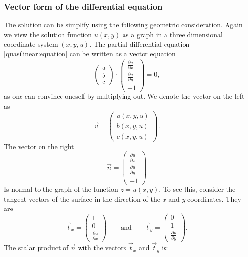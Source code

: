 \subsubsection{Vector form of the differential equation}
The solution can be simplify using the following geometric consideration.
Again we view the solution function $u(x,y)$ as a graph in a three dimensional
coordinate system $(x,y,u)$.
The partial differential equation \eqref{quasilinear:equation}
can be written as a vector equation
\begin{equation}
\begin{pmatrix}a\\b\\c\end{pmatrix}
\cdot
\begin{pmatrix}
\frac{\partial u}{\partial x}\\
\frac{\partial u}{\partial y}\\
-1
\end{pmatrix}
=0,
\label{quasilinear:vektorform}
\end{equation}
as one can convince oneself by multiplying out.
We denote the vector on the left as
\[
\vec v=\begin{pmatrix}
a(x,y,u)\\
b(x,y,u)\\
c(x,y,u)
\end{pmatrix}.
\]
The vector on the right
\[
\vec n=
\begin{pmatrix}
\frac{\partial u}{\partial x}\\
\frac{\partial u}{\partial y}\\
-1
\end{pmatrix}
\]
Is normal to the graph of the function $z=u(x,y)$.
To see this, consider the tangent vectors of the surface in the
direction of the $x$ and $y$ coordinates.
They are
\[
\vec t_x
=
\begin{pmatrix}1\\0\\\frac{\partial u}{\partial x}\end{pmatrix}
\qquad
\text{and}
\qquad
\vec t_y
=
\begin{pmatrix}0\\1\\\frac{\partial u}{\partial y}\end{pmatrix}.
\]
The scalar product of $\vec n$ with the vectors $\vec{t}_x$ and $\vec{t}_y$
is:
